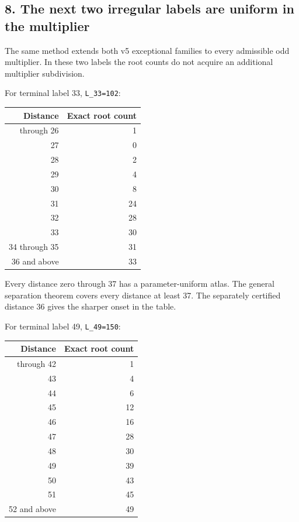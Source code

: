 \documentclass[11pt,letterpaper]{article}
\begin{document}
\subsection{8. The next two irregular labels are uniform in the multiplier}\label{the-next-two-irregular-labels-are-uniform-in-the-multiplier}

The same method extends both v5 exceptional families to every admissible odd multiplier. In these two labels the root counts do not acquire an additional multiplier subdivision.

For terminal label 33, \texttt{L\_33=102}:

\begin{longtable}[]{@{}rr@{}}
\toprule\noalign{}
Distance & Exact root count \\
\midrule\noalign{}
\endhead
\bottomrule\noalign{}
\endlastfoot
0 through 26 & 1 \\
27 & 0 \\
28 & 2 \\
29 & 4 \\
30 & 8 \\
31 & 24 \\
32 & 28 \\
33 & 30 \\
34 through 35 & 31 \\
36 and above & 33 \\
\end{longtable}

Every distance zero through 37 has a parameter-uniform atlas. The general separation theorem covers every distance at least 37. The separately certified distance 36 gives the sharper onset in the table.

For terminal label 49, \texttt{L\_49=150}:

\begin{longtable}[]{@{}rr@{}}
\toprule\noalign{}
Distance & Exact root count \\
\midrule\noalign{}
\endhead
\bottomrule\noalign{}
\endlastfoot
0 through 42 & 1 \\
43 & 4 \\
44 & 6 \\
45 & 12 \\
46 & 16 \\
47 & 28 \\
48 & 30 \\
49 & 39 \\
50 & 43 \\
51 & 45 \\
52 and above & 49 \\
\end{longtable}
\end{document}
